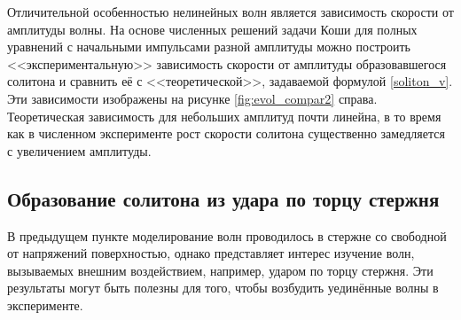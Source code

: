 \documentclass[12pt, a4paper]{report}
\begin{document}
Отличительной особенностью нелинейных волн является зависимость скорости от амплитуды волны. На основе численных решений задачи Коши для полных уравнений с начальными импульсами разной амплитуды можно построить <<экспериментальную>> зависимость скорости от амплитуды образовавшегося солитона и сравнить её с <<теоретической>>, задаваемой формулой \eqref{soliton_v}. Эти зависимости изображены на рисунке \ref{fig:evol_compar2} справа. Теоретическая зависимость для небольших амплитуд почти линейна, в то время как в численном эксперименте рост скорости солитона существенно замедляется с увеличением амплитуды.




\subsection{Образование солитона из удара по торцу стержня}
В предыдущем пункте моделирование волн проводилось в стержне со свободной от напряжений поверхностью, однако представляет интерес изучение волн, вызываемых внешним воздействием, например, ударом по торцу стержня. Эти результаты могут быть полезны для того, чтобы возбудить уединённые волны в эксперименте. 
\end{document}
